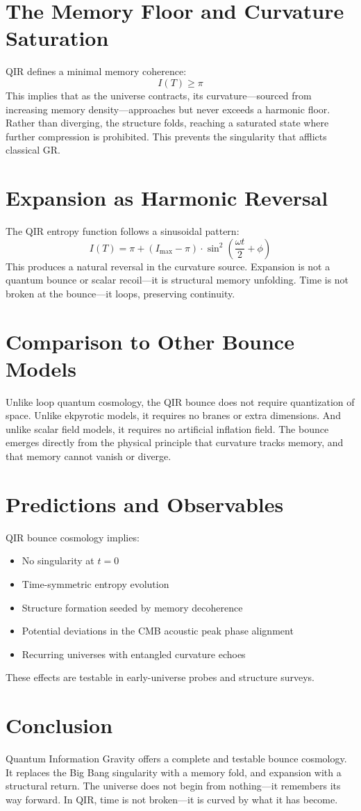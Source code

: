 \documentclass[11pt]{article}
\begin{document}
\section{The Memory Floor and Curvature Saturation}
QIR defines a minimal memory coherence:
\[
I(T) \geq \pi
\]
This implies that as the universe contracts, its curvature—sourced from increasing memory density—approaches but never exceeds a harmonic floor. Rather than diverging, the structure folds, reaching a saturated state where further compression is prohibited. This prevents the singularity that afflicts classical GR.

\section{Expansion as Harmonic Reversal}
The QIR entropy function follows a sinusoidal pattern:
\[
I(T) = \pi + (I_{\text{max}} - \pi) \cdot \sin^2\left(\frac{\omega t}{2} + \phi\right)
\]
This produces a natural reversal in the curvature source. Expansion is not a quantum bounce or scalar recoil—it is structural memory unfolding. Time is not broken at the bounce—it loops, preserving continuity.

\section{Comparison to Other Bounce Models}
Unlike loop quantum cosmology, the QIR bounce does not require quantization of space. Unlike ekpyrotic models, it requires no branes or extra dimensions. And unlike scalar field models, it requires no artificial inflation field. The bounce emerges directly from the physical principle that curvature tracks memory, and that memory cannot vanish or diverge.

\section{Predictions and Observables}
QIR bounce cosmology implies:
\begin{itemize}
  \item No singularity at \( t = 0 \)
  \item Time-symmetric entropy evolution
  \item Structure formation seeded by memory decoherence
  \item Potential deviations in the CMB acoustic peak phase alignment
  \item Recurring universes with entangled curvature echoes
\end{itemize}

These effects are testable in early-universe probes and structure surveys.

\section{Conclusion}
Quantum Information Gravity offers a complete and testable bounce cosmology. It replaces the Big Bang singularity with a memory fold, and expansion with a structural return. The universe does not begin from nothing—it remembers its way forward. In QIR, time is not broken—it is curved by what it has become.
\end{document}
